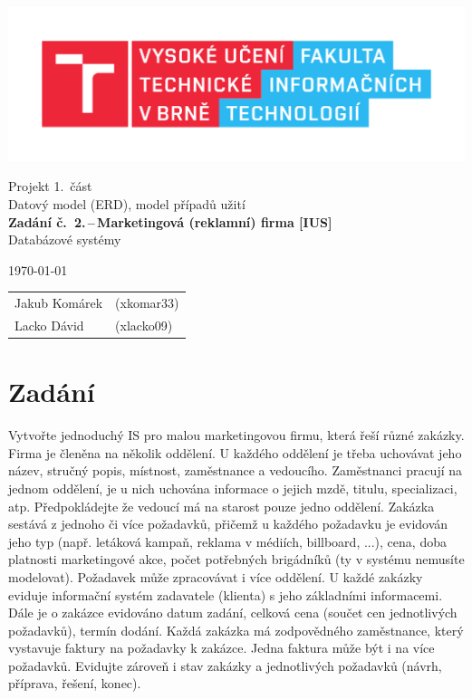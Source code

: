 \documentclass[11pt, a4paper]{article}
\begin{document}
	\begin{titlepage}
		\begin{center}
			\includegraphics[width=0.77 \linewidth]{FIT_logo.pdf} \\


			\Huge{Projekt 1.~část} \\
			\Huge{Datový model (ERD), model případů užití} \\
			\LARGE{\textbf{Zadání č.~2.\,--\,Marketingová (reklamní) firma [IUS]}} \\
			\Large{Databázové systémy}

		\end{center}

		{\Large
			\today
			\hfill
			\begin{tabular}{l l}
				Jakub Komárek & (xkomar33) \\
				Lacko Dávid & (xlacko09) \\
			\end{tabular}
		}
	\end{titlepage}
	
	
	\section{Zadání}
	\qquad Vytvořte jednoduchý IS pro malou marketingovou firmu, která řeší různé zakázky. Firma je členěna na několik oddělení. U každého oddělení je třeba uchovávat jeho název, stručný popis, místnost, zaměstnance a vedoucího. Zaměstnanci pracují na jednom oddělení, je u nich uchována informace o jejich mzdě, titulu, specializaci, atp. Předpokládejte že vedoucí má na starost pouze jedno oddělení. Zakázka sestává z jednoho či více požadavků, přičemž u každého požadavku je evidován jeho typ (např. letáková kampaň, reklama v médiích, billboard, ...), cena, doba platnosti marketingové akce, počet potřebných brigádníků (ty v systému nemusíte modelovat). Požadavek může zpracovávat i více oddělení. U každé zakázky eviduje informační systém zadavatele (klienta) s jeho základními informacemi. Dále je o zakázce evidováno datum zadání, celková cena (součet cen jednotlivých požadavků), termín dodání. Každá zakázka má zodpovědného zaměstnance, který vystavuje faktury na požadavky k zakázce. Jedna faktura může být i na více požadavků. Evidujte zároveň i stav zakázky a jednotlivých požadavků (návrh, příprava, řešení, konec).
	\newpage
	
\end{document}
